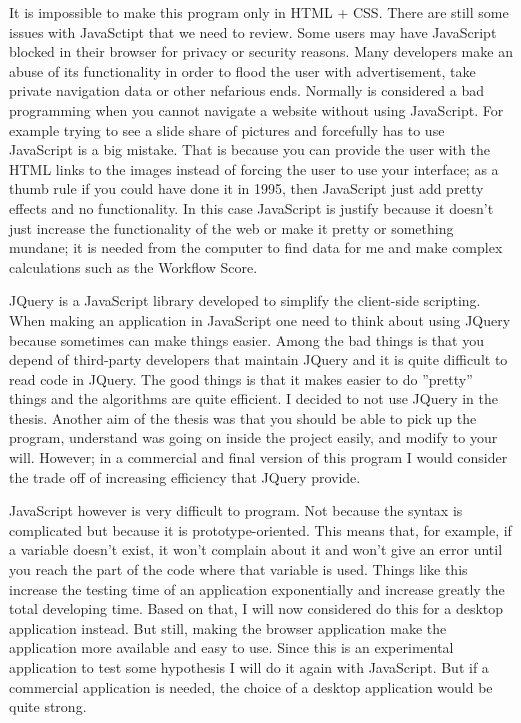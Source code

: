 \documentclass[a4paper,10pt]{article}
\begin{document}
    It is impossible to make this program only in HTML + CSS. There are still some issues with JavaSctipt that we need to review. Some users may have JavaScript blocked in their browser for privacy or security reasons. Many developers make an abuse of its functionality in order to flood the user with advertisement, take private navigation data or other nefarious ends. Normally is considered a bad programming when you cannot navigate a website without using JavaScript. For example trying to see a slide share of pictures and forcefully has to use JavaScript is a big mistake. That is because you can provide the user with the HTML links to the images instead of forcing the user to use your interface; as a thumb rule if you could have done it in 1995, then JavaScript just add pretty effects and no functionality. In this case JavaScript is justify because it doesn't just increase the functionality of the web or make it pretty or something mundane; it is needed from the computer to find data for me and make complex calculations such as the Workflow Score.\vspace{3 mm}
 
    JQuery is a JavaScript library \cite{jquery} developed to simplify the client-side scripting. When making an application in JavaScript one need to think about using JQuery because sometimes can make things easier. Among the bad things is that you depend of third-party developers that maintain JQuery and  it is quite difficult to read code in JQuery. The good things is that it makes easier to do ''pretty'' things and the algorithms are quite efficient. I decided to not use JQuery in the thesis. Another aim of the thesis was that you should be able to pick up the program, understand was going on inside the project easily, and modify to your will. However; in a commercial and final version of this program I would consider the trade off of increasing efficiency that JQuery provide.\vspace{3 mm}

    JavaScript however is very difficult to program. Not because the syntax is complicated but because it is prototype-oriented. This means that, for example, if a variable doesn't exist, it won't complain about it and won't give an error until you reach the part of the code where that variable is used. Things like this increase the testing time of an application exponentially and increase greatly the total developing time. Based on that, I will now considered do this for a desktop application instead. But still, making the browser application make the application more available and easy to use. Since this is an experimental application to test some hypothesis I will do it again with JavaScript. But if a commercial application is needed, the choice of a desktop application would be quite strong.\vspace{3 mm}
\end{document}
